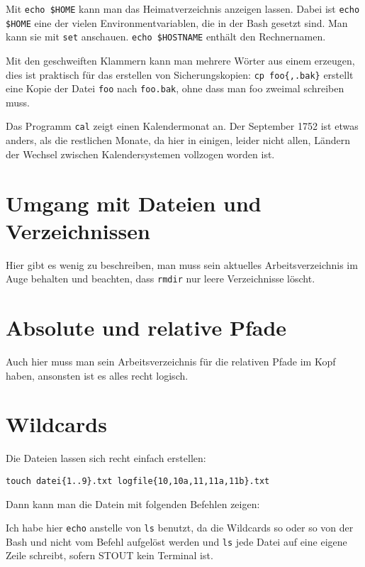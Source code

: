 \documentclass[12pt]{report}
\begin{document}
Mit \texttt{echo \${HOME}} kann man das Heimatverzeichnis anzeigen lassen. Dabei ist \texttt{echo \$HOME} eine der vielen Environmentvariablen, die in der Bash gesetzt sind. Man kann sie mit \texttt{set} anschauen. \texttt{echo \${HOSTNAME}} enthält den Rechnernamen.

Mit den geschweiften Klammern kann man mehrere Wörter aus einem erzeugen, dies ist praktisch für das erstellen von Sicherungskopien: \verb#cp foo{,.bak}# erstellt eine Kopie der Datei \texttt{foo} nach \texttt{foo.bak}, ohne dass man foo zweimal schreiben muss.

Das Programm \texttt{cal} zeigt einen Kalendermonat an. Der September 1752 ist etwas anders, als die restlichen Monate, da hier in einigen, leider nicht allen, Ländern der Wechsel zwischen Kalendersystemen vollzogen worden ist.

\section{Umgang mit Dateien und Verzeichnissen}

Hier gibt es wenig zu beschreiben, man muss sein aktuelles Arbeitsverzeichnis im Auge behalten und beachten, dass \texttt{rmdir} nur leere Verzeichnisse löscht.

\section{Absolute und relative Pfade}

Auch hier muss man sein Arbeitsverzeichnis für die relativen Pfade im Kopf haben, ansonsten ist es alles recht logisch.

\section{Wildcards}

Die Dateien lassen sich recht einfach erstellen:
\begin{lstlisting}[caption=Anlegen der Dateien]
touch datei{1..9}.txt logfile{10,10a,11,11a,11b}.txt
\end{lstlisting}

Dann kann man die Datein mit folgenden Befehlen zeigen:



Ich habe hier \texttt{echo} anstelle von \texttt{ls} benutzt, da die Wildcards so oder so von der Bash und nicht vom Befehl aufgelöst werden und \texttt{ls} jede Datei auf eine eigene Zeile schreibt, sofern STOUT kein Terminal ist.
\end{document}
